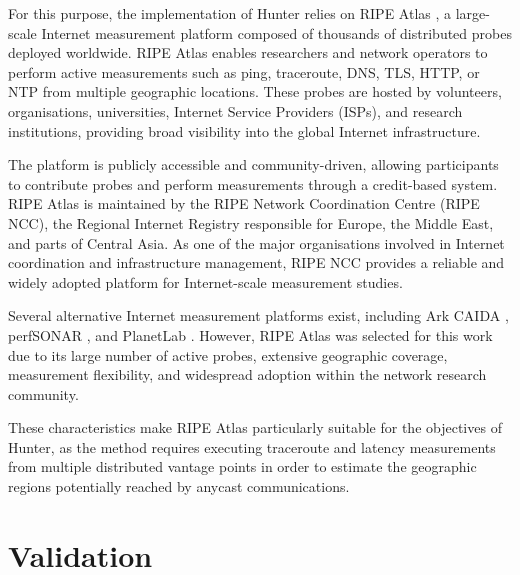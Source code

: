 For this purpose, the implementation of Hunter relies on RIPE Atlas \cite{HomeAtlas}, a large-scale Internet measurement platform composed of thousands of distributed probes deployed worldwide. RIPE Atlas enables researchers and network operators to perform active measurements such as ping, traceroute, DNS, TLS, HTTP, or NTP from multiple geographic locations. These probes are hosted by volunteers, organisations, universities, Internet Service Providers (ISPs), and research institutions, providing broad visibility into the global Internet infrastructure.

The platform is publicly accessible and community-driven, allowing participants to contribute probes and perform measurements through a credit-based system. RIPE Atlas is maintained by the RIPE Network Coordination Centre (RIPE NCC), the Regional Internet Registry responsible for Europe, the Middle East, and parts of Central Asia. As one of the major organisations involved in Internet coordination and infrastructure management, RIPE NCC provides a reliable and widely adopted platform for Internet-scale measurement studies.

Several alternative Internet measurement platforms exist, including Ark CAIDA \cite{ArkCAIDA}, perfSONAR \cite{PerfSONAR}, and PlanetLab \cite{HomePlanetLab}. However, RIPE Atlas was selected for this work due to its large number of active probes, extensive geographic coverage, measurement flexibility, and widespread adoption within the network research community.

These characteristics make RIPE Atlas particularly suitable for the objectives of Hunter, as the method requires executing traceroute and latency measurements from multiple distributed vantage points in order to estimate the geographic regions potentially reached by anycast communications.

\section{Validation}\label{sc:hunter_validation}


